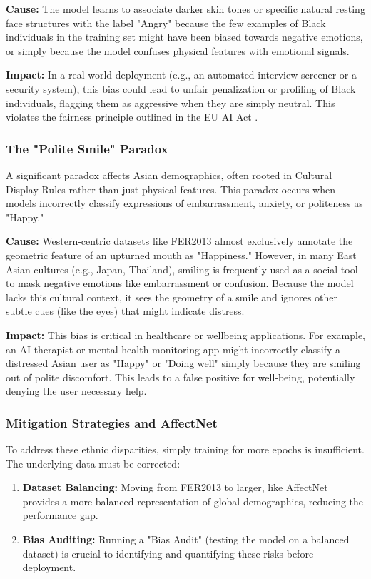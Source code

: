 \documentclass[12pt,a4paper]{article}
\begin{document}
\textbullet \textbf{Cause:} The model learns to associate darker skin tones or specific natural resting face structures with the label "Angry" because the few examples of Black individuals in the training set might have been biased towards negative emotions, or simply because the model confuses physical features with emotional signals.

\textbullet \textbf{Impact:} In a real-world deployment (e.g., an automated interview screener or a security system), this bias could lead to unfair penalization or profiling of Black individuals, flagging them as aggressive when they are simply neutral. This violates the fairness principle outlined in the EU AI Act \cite{aiact}.

\subsubsection*{The "Polite Smile" Paradox}
A significant paradox affects Asian demographics, often rooted in Cultural Display Rules rather than just physical features. This paradox occurs when models incorrectly classify expressions of embarrassment, anxiety, or politeness as "Happy."

\textbullet \textbf{Cause:} Western-centric datasets like FER2013 almost exclusively annotate the geometric feature of an upturned mouth as "Happiness." However, in many East Asian cultures (e.g., Japan, Thailand), smiling is frequently used as a social tool to mask negative emotions like embarrassment or confusion. Because the model lacks this cultural context, it sees the geometry of a smile and ignores other subtle cues (like the eyes) that might indicate distress.

\textbullet \textbf{Impact:} This bias is critical in healthcare or wellbeing applications. For example, an AI therapist or mental health monitoring app might incorrectly classify a distressed Asian user as "Happy" or "Doing well" simply because they are smiling out of polite discomfort. This leads to a false positive for well-being, potentially denying the user necessary help.

\subsubsection*{Mitigation Strategies and AffectNet}
To address these ethnic disparities, simply training for more epochs is insufficient. The underlying data must be corrected:
\begin{enumerate}
\item \textbf{Dataset Balancing:} Moving from FER2013 to larger, like AffectNet provides a more balanced representation of global demographics, reducing the performance gap.

\item \textbf{Bias Auditing:} Running a "Bias Audit" (testing the model on a balanced dataset) is crucial to identifying and quantifying these risks before deployment.
\end{enumerate}
\end{document}
